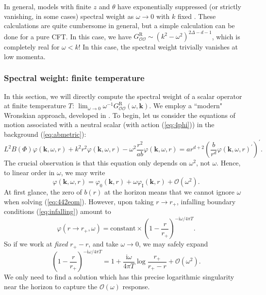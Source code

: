 \documentclass[10pt, oneside]{book}
\begin{document}
\begin{doublespace}
In general, models with finite $z$ and $\theta$ have exponentially suppressed (or strictly vanishing, in some cases) spectral weight as $\omega \rightarrow 0$ with $k$ fixed \cite{Hartnoll:2012wm}.   These calculations are quite cumbersome in general, but a simple calculation can be done for a pure CFT.  In this case, we have $G^{\mathrm{R}}_{\mathcal{OO}} \sim (k^2-\omega^2)^{2\Delta-d-1}$, which is completely real for $\omega < k$!  In this case, the spectral weight trivially vanishes at low momenta.

\subsubsection{Spectral weight: finite temperature}\label{sec:SWT}
In this section, we will directly compute the spectral weight of a scalar operator at finite temperature $T$:  $\lim_{\omega \rightarrow 0}  \omega^{-1}G^{\mathrm{R}}_{\mathcal{OO}}(\omega,\mathbf{k})$.  We employ a ``modern" Wronskian approach, developed in \cite{Lucas:2015vna}.  To begin, let us consider the equations of motion associated with a neutral scalar (with action (\ref{eq:4phi})) in the background (\ref{eq:abmetric}):\begin{equation}
L^2 B(\Phi)\varphi(\mathbf{k},\omega,r) + k^2 r^2  \varphi(\mathbf{k},\omega, r) - \omega^2\frac{r^2}{ab}  \varphi(\mathbf{k},\omega, r)  = a r^{d+2} \left( \frac{b}{r^d} \varphi(\mathbf{k},\omega,r)^\prime \right)^\prime.  \label{eq:442eom}
\end{equation}
The crucial observation is that this equation only depends on $\omega^2$, not $\omega$.   Hence, to linear order in $\omega$, we may write \begin{equation}
\varphi(\mathbf{k},\omega,r) = \varphi_0(\mathbf{k},r) + \omega \varphi_{\mathrm{I}}(\mathbf{k},r) + \mathcal{O}\left(\omega^2\right).
\end{equation}
At first glance, the zero of $b(r)$ at the horizon means that we cannot ignore $\omega$ when solving (\ref{eq:442eom}).   However, upon taking $r\rightarrow r_+$,  infalling boundary conditions (\ref{eq:infalling}) amount to \begin{equation}
\varphi(r\rightarrow r_+, \omega) = \text{constant} \times \left(1-\frac{r}{r_+}\right)^{-\mathrm{i}\omega/4\pi T}.
\end{equation}
So if we work at \emph{fixed} $r_+-r$, and take $\omega \rightarrow 0$, we may safely expand \begin{equation}
\left(1-\frac{r}{r_+}\right)^{-\mathrm{i}\omega/4\pi T} = 1 + \frac{\mathrm{i}\omega}{4\pi T} \log \frac{r_+}{r_+-r} + \mathcal{O}\left(\omega^2\right).   \label{eq:omegaexpand}
\end{equation}
We only need to find a solution which has this precise logarithmic singularity near the horizon to capture the $\mathcal{O}(\omega)$  response.


\end{doublespace}
\end{document}
